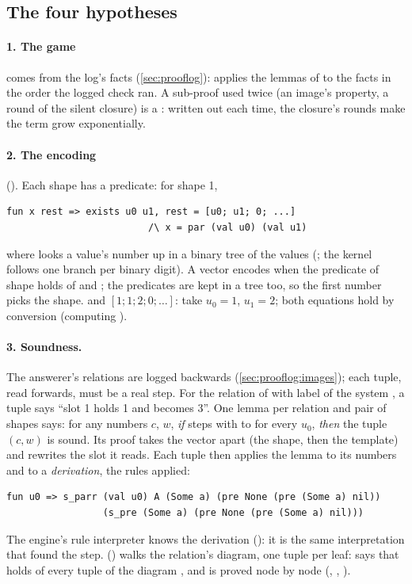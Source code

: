 \subsection{The four hypotheses}\label{sec:qed:parts}

\paragraph{1. The game} comes from the log's facts (\cref{sec:prooflog}):
 applies the lemmas of 
to the facts in the order the logged check ran. A sub-proof used twice
(an image's property, a round of the silent closure) is a :
written out each time, the closure's rounds make the term grow
exponentially.

\paragraph{2. The encoding} (). Each shape has a
predicate: for shape 1,
\begin{verbatim}
fun x rest => exists u0 u1, rest = [u0; u1; 0; ...]
                         /\ x = par (val u0) (val u1)
\end{verbatim}
where  looks a value's number up in a binary tree of the values
(; the kernel follows one branch per binary digit). A
vector  encodes  when the predicate of shape
 holds of  and ; the predicates are kept in a
tree too, so the first number picks the shape.  and
$[1; 1; 2; 0; \dots]$: take $u_0 = 1$, $u_1 = 2$; both equations hold by
conversion (computing ).

\paragraph{3. Soundness.} The answerer's relations are logged backwards
(\cref{sec:prooflog:images}); each tuple, read forwards, must be a real
step. For the relation of  with label  of the
system , a tuple says ``slot 1 holds 1 and becomes 3''.
One lemma per relation and pair of shapes says: for any numbers $c$, $w$,
\emph{if}  steps with  to
 for every $u_0$, \emph{then} the tuple
$(c, w)$ is sound. Its proof takes the vector apart (the shape, then the
template) and rewrites the slot it reads. Each tuple then applies the
lemma to its numbers and to a \emph{derivation}, the rules applied:
\begin{verbatim}
fun u0 => s_parr (val u0) A (Some a) (pre None (pre (Some a) nil))
                 (s_pre (Some a) (pre None (pre (Some a) nil)))
\end{verbatim}
The engine's rule interpreter knows the derivation
(): it is the same interpretation that found the
step.  () walks the relation's diagram,
one tuple per leaf:  says that  holds of every
tuple of the diagram , and is proved node by node (,
, ).

